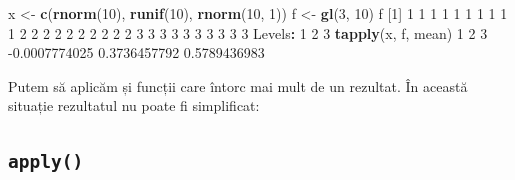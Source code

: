 \documentclass[]{article}
\newenvironment{Shaded}{\begin{snugshade}}{\end{snugshade}}
\newcommand{\DataTypeTok}[1]{\textcolor[rgb]{0.13,0.29,0.53}{#1}}
\newcommand{\DecValTok}[1]{\textcolor[rgb]{0.00,0.00,0.81}{#1}}
\newcommand{\FloatTok}[1]{\textcolor[rgb]{0.00,0.00,0.81}{#1}}
\newcommand{\KeywordTok}[1]{\textcolor[rgb]{0.13,0.29,0.53}{\textbf{#1}}}
\newcommand{\NormalTok}[1]{#1}
\newcommand{\OperatorTok}[1]{\textcolor[rgb]{0.81,0.36,0.00}{\textbf{#1}}}
\newcommand{\StringTok}[1]{\textcolor[rgb]{0.31,0.60,0.02}{#1}}
\newcounter{exo}[section]
\begin{document}
\begin{Shaded}
\begin{Highlighting}[]
\NormalTok{x <-}\StringTok{ }\KeywordTok{c}\NormalTok{(}\KeywordTok{rnorm}\NormalTok{(}\DecValTok{10}\NormalTok{), }\KeywordTok{runif}\NormalTok{(}\DecValTok{10}\NormalTok{), }\KeywordTok{rnorm}\NormalTok{(}\DecValTok{10}\NormalTok{, }\DecValTok{1}\NormalTok{))}
\NormalTok{f <-}\StringTok{ }\KeywordTok{gl}\NormalTok{(}\DecValTok{3}\NormalTok{, }\DecValTok{10}\NormalTok{)   }
\NormalTok{f}
\NormalTok{ [}\DecValTok{1}\NormalTok{] }\DecValTok{1} \DecValTok{1} \DecValTok{1} \DecValTok{1} \DecValTok{1} \DecValTok{1} \DecValTok{1} \DecValTok{1} \DecValTok{1} \DecValTok{1} \DecValTok{2} \DecValTok{2} \DecValTok{2} \DecValTok{2} \DecValTok{2} \DecValTok{2} \DecValTok{2} \DecValTok{2} \DecValTok{2} \DecValTok{2} \DecValTok{3} \DecValTok{3} \DecValTok{3} \DecValTok{3} \DecValTok{3} \DecValTok{3} \DecValTok{3} \DecValTok{3} \DecValTok{3} \DecValTok{3}
\NormalTok{Levels}\OperatorTok{:}\StringTok{ }\DecValTok{1} \DecValTok{2} \DecValTok{3}
\KeywordTok{tapply}\NormalTok{(x, f, mean)}
            \DecValTok{1}             \DecValTok{2}             \DecValTok{3} 
\FloatTok{-0.0007774025}  \FloatTok{0.3736457792}  \FloatTok{0.5789436983} 
\end{Highlighting}
\end{Shaded}

Putem să aplicăm și funcții care întorc mai mult de un rezultat. În
această situație rezultatul nu poate fi simplificat:

\begin{Shaded}
\end{Shaded}

\hypertarget{apply}{%
\subsection{\texorpdfstring{\texttt{apply()}}{apply()}}\label{apply}}
\end{document}
